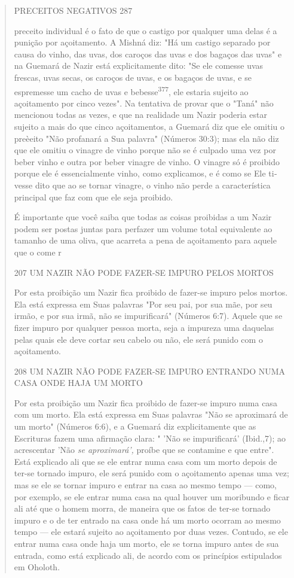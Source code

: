 \begin{quote}
PRECEITOS NEGATIVOS 287

preceito individual é o fato de que o castigo por qualquer uma delas é a
puni­ção por açoitamento. A Mishná diz: "Há um castigo separado por
causa do vi­nho, das uvas, dos caroços das uvas e dos bagaços das uvas"
e na Guemará de Nazir está explicitamente dito: "Se ele comesse uvas
frescas, uvas secas, os ca­roços de uvas, e os bagaços de uvas, e se
espremesse um cacho de uvas e bebesse\textsuperscript{377}, ele estaria
sujeito ao açoitamento por cinco vezes". Na tentativa de provar que o
"Taná" não mencionou todas as vezes, e que na realidade um Nazir poderia
estar sujeito a mais do que cinco açoitamentos, a Guemará diz que ele
omitiu o preèeito "Não profanará a Sua palavra" (Números 30:3); mas ela
não diz que ele omitiu o vinagre de vinho porque não se é culpado uma
vez por beber vinho e outra por beber vinagre de vinho. O vinagre só é
proibi­do porque ele é essencialmente vinho, como explicamos, e é como
se Ele ti­vesse dito que ao se tornar vinagre, o vinho não perde a
característica principal que faz com que ele seja proibido.

É importante que você saiba que todas as coisas proibidas a um Na­zir
podem ser postas juntas para perfazer um volume total equivalente ao
tama­nho de uma oliva, que acarreta a pena de açoitamento para aquele
que o co­me r

207 UM NAZIR NÃO PODE FAZER-SE IMPURO PELOS MORTOS

Por esta proibição um Nazir fica proibido de fazer-se impuro pelos
mortos. Ela está expressa em Suas palavras "Por seu pai, por sua mãe,
por seu irmão, e por sua irmã, não se impurificará" (Números 6:7).
Aquele que se fizer impuro por qualquer pessoa morta, seja a impureza
uma daquelas pelas quais ele deve cortar seu cabelo ou não, ele será
punido com o açoitamento.

208 UM NAZIR NÃO PODE FAZER-SE IMPURO ENTRANDO NUMA CASA ONDE HAJA UM
MORTO

Por esta proibição um Nazir fica proibido de fazer-se impuro numa casa
com um morto. Ela está expressa em Suas palavras "Não se aproximará de
um morto" (Números 6:6), e a Guemará diz explicitamente que as
Escrituras fazem uma afirmação clara: " 'Não se impurificará' (Ibid.,7);
ao acrescentar 'Não \emph{se aproximará',} proíbe que se contamine e que
entre". Está explicado ali que se ele entrar numa casa com um morto
depois de ter-se tornado impuro, ele será punido com o açoitamento
apenas uma vez; mas se ele se tornar impuro e entrar na casa ao mesmo
tempo --- como, por exemplo, se ele entrar numa casa na qual houver um
moribundo e ficar ali até que o homem morra, de ma­neira que os fatos de
ter-se tornado impuro e o de ter entrado na casa onde há um morto
ocorram ao mesmo tempo --- ele estará sujeito ao açoitamento por duas
vezes. Contudo, se ele entrar numa casa onde haja um morto, ele se torna
impuro antes de sua entrada, como está explicado ali, de acordo com os
princípios estipulados em Oholoth.


\end{quote}
